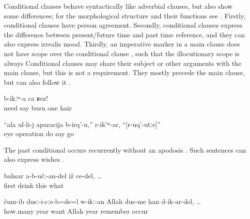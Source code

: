Conditional clauses behave syntactically like adverbial clauses, but also show some differences; for the morphological structure and their functions see . Firstly, conditional clauses have person agreement. Secondly, conditional clauses express the difference between present/future time and past time reference, and they can also express irrealis mood. Thirdly, an imperative marker in a main clause does not have scope over the conditional clause , such that the illocutionary scope is always  Conditional clauses may share their subject or other arguments with the main clause, but this is not a requirement. They mostly precede the main clause, but can also follow it .
%
\begin{exe}
	\ex	\label{ex:‎‎‎If you need me, burn one hair}
		b-ikːʷ-a	ca	ʁez!\\
			need	say	burn	one	hair\\
	\glt	{}

	\ex	\label{ex:‎‎‎(They) will operate your eye, she said, if you go (to the doctor)}
	\gll	``ala	ul-li-j	aparacija	b-irq'-u,''	r-ik'ʷ-ar,	``[r-uq'-utːe]''\\
			eye	operation	do	\tsc{f-}say	go\\
	\glt	{}
\end{exe}

The past conditional occurs recurrently without an apodosis . Such sentences can also express wishes .
%
\begin{exe}
	\ex	\label{ex:‎if he did not drink first}
	\gll	bahsar	a-b-učː-an-del	iž	ce-del, \ldots	\\
		first	drink	this	what\\
	\glt	{}

	\ex	\label{ex:‎‎‎In which year it was, beloved Allah, if I would remember the years}
	\gll	čum-ib	dusː-i-cːe-b=de=l	w-ikː-an	Allah	dus-me	han	d-ik-ar-del, \ldots\\
		how.many	year	want	Allah	year	remember	occur\\
	\glt	{}
\end{exe}

